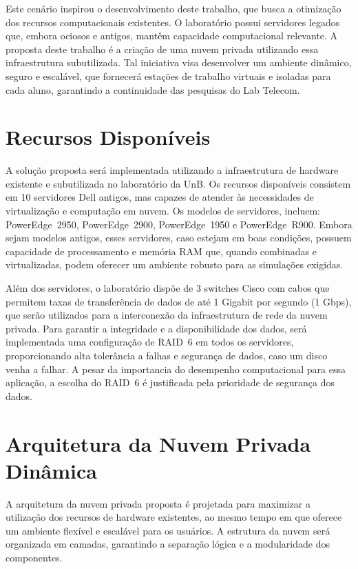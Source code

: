 Este cenário inspirou o desenvolvimento deste trabalho, que busca a otimização dos recursos computacionais existentes. O laboratório possui servidores legados que, embora ociosos e antigos, mantêm capacidade computacional relevante. A proposta deste trabalho é a criação de uma nuvem privada utilizando essa infraestrutura subutilizada. Tal iniciativa visa desenvolver um ambiente dinâmico, seguro e escalável, que fornecerá estações de trabalho virtuais e isoladas para cada aluno, garantindo a continuidade das pesquisas do Lab Telecom.

\section{Recursos Disponíveis}

A solução proposta será implementada utilizando a infraestrutura de hardware existente e subutilizada no laboratório da UnB. Os recursos disponíveis consistem em 10 servidores Dell antigos, mas capazes de atender às necessidades de virtualização e computação em nuvem. Os modelos de servidores, incluem: PowerEdge~2950, PowerEdge~2900, PowerEdge~1950 e PowerEdge~R900. Embora sejam modelos antigos, esses servidores, caso estejam em boas condições, possuem capacidade de processamento e memória RAM que, quando combinadas e virtualizadas, podem oferecer um ambiente robusto para as simulações exigidas.

Além dos servidores, o laboratório dispõe de 3 switches Cisco com cabos que permitem taxas de transferência de dados de até 1 Gigabit por segundo (1 Gbps), que serão utilizados para a interconexão da infraestrutura de rede da nuvem privada. Para garantir a integridade e a disponibilidade dos dados, será implementada uma configuração de RAID~6 em todos os servidores, proporcionando alta tolerância a falhas e segurança de dados, caso um disco venha a falhar. A pesar da importancia do desempenho computacional para essa aplicação, a escolha do RAID~6 é justificada pela prioridade de segurança dos dados.

\section{Arquitetura da Nuvem Privada Dinâmica}

A arquitetura da nuvem privada proposta é projetada para maximizar a utilização dos recursos de hardware existentes, ao mesmo tempo em que oferece um ambiente flexível e escalável para os usuários. A estrutura da nuvem será organizada em camadas, garantindo a separação lógica e a modularidade dos componentes.

